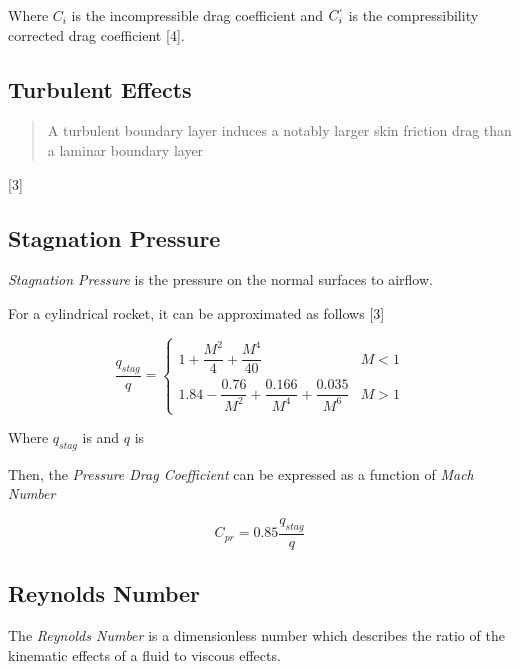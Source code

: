 \documentclass[]{article}
\begin{document}

Where \(C_i\) is the incompressible drag coefficient and \(C^`_i\) is
the compressibility corrected drag coefficient {[}4{]}.

\subsection{Turbulent Effects}\label{turbulent-effects}

\begin{quote}
A turbulent boundary layer induces a notably larger skin friction drag
than a laminar boundary layer
\end{quote}

{[}3{]}

\subsection{Stagnation Pressure}\label{stagnation-pressure}

\emph{Stagnation Pressure} is the pressure on the normal surfaces to
airflow.

For a cylindrical rocket, it can be approximated as follows {[}3{]}

\begin{equation}
\label{eq_stagnation_pressure_blunt_cylinder}
\dfrac{q_{stag}}{q} =  
\begin{cases}
    1 + \dfrac{M^2}{4} + \dfrac{M^4}{40}                                    & M < 1 \\
    1.84 - \dfrac{0.76}{M^2} + \dfrac{0.166}{M^4} + \dfrac{0.035}{M^6}      & M > 1
\end{cases}
\end{equation}

Where \(q_{stag}\) is and \(q\) is

Then, the \emph{Pressure Drag Coefficient} can be expressed as a
function of \emph{Mach Number}

\begin{equation}
\label{eq_pressure_drag_coefficient}
C_{pr} = 0.85 \dfrac{q_{stag}}{q}
\end{equation}

\subsection{Reynolds Number}\label{reynolds-number}

The \emph{Reynolds Number} is a dimensionless number which describes the
ratio of the kinematic effects of a fluid to viscous effects.
\end{document}

